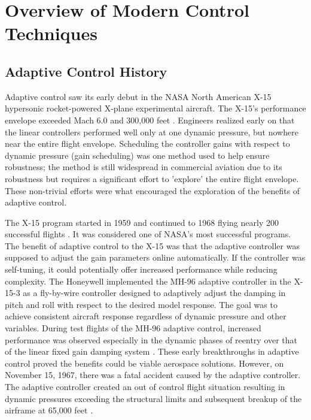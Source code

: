 \chapter{Overview of Modern Control Techniques}\label{ch:problem}

\section{Adaptive Control History}\label{history}
Adaptive control saw its early debut in the NASA North American X-15 hypersonic rocket-powered X-plane experimental aircraft.  The X-15's performance envelope exceeded Mach 6.0 and 300,000 feet \cite{jenkins2000x15specs}.  Engineers realized early on that the linear controllers performed well only at one dynamic pressure, but nowhere near the entire flight envelope.  Scheduling the controller gains with respect to dynamic pressure (gain scheduling) was one method used to help ensure robustness;  the method is still widespread in commercial aviation due to its robustness but requires a significant effort to 'explore' the entire flight envelope.  These non-trivial efforts were what encouraged the exploration of the benefits of adaptive control.

The X-15 program started in 1959 and continued to 1968 flying nearly 200 successful flights \cite{nasa_x15_facts}.  It was considered one of NASA's most successful programs.  The benefit of adaptive control to the X-15 was that the adaptive controller was supposed to adjust the gain parameters online automatically.  If the controller was self-tuning, it could potentially offer increased performance while reducing complexity.  The Honeywell implemented the MH-96 adaptive controller in the X-15-3 as a fly-by-wire controller designed to adaptively adjust the damping in pitch and roll with respect to the desired model response.  The goal was to achieve consistent aircraft response regardless of dynamic pressure and other variables.  During test flights of the MH-96 adaptive control, increased performance was observed especially in the dynamic phases of reentry over that of the linear fixed gain damping system \cite{dydek2010adaptive}.  These early breakthroughs in adaptive control proved the benefits could be viable aerospace solutions.  However, on November 15, 1967, there was a fatal accident caused by the adaptive controller.  The adaptive controller created an out of control flight situation resulting in dynamic pressures exceeding the structural limits and subsequent breakup of the airframe at 65,000 feet \cite{nasa_x15_facts}.

